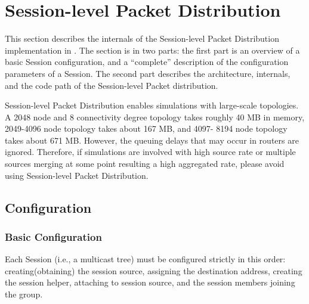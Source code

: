 \chapter{Session-level Packet Distribution}
\label{chap:session}

This section describes the internals of the Session-level Packet Distribution
implementation in \ns.
The section is in two parts:
the first part is an overview of 
a basic Session configuration,
and a ``complete'' description of the configuration parameters 
of a Session.
The second part describes the architecture, internals, and the code path
of the Session-level Packet distribution.

Session-level Packet Distribution enables simulations with large-scale 
topologies.  A 2048 node and 8 connectivity degree topology takes roughly 
40 MB in memory, 2049-4096 node topology takes about 167 MB, and 4097-
8194 node topology takes about 671 MB.  However, the queuing delays that
may occur in routers are ignored.  Therefore, if simulations are involved 
with high source rate or multiple sources merging at some point resulting
a high aggregated rate, please avoid using Session-level Packet Distribution.

\section{Configuration}

\subsection{Basic Configuration}
\label{sec:basic-config}

Each Session (i.e., a multicast tree) must be configured strictly in
this order:
creating(obtaining) the session source,
assigning the destination address,
creating the session helper, 
attaching to session source, and
the session members joining the group.



